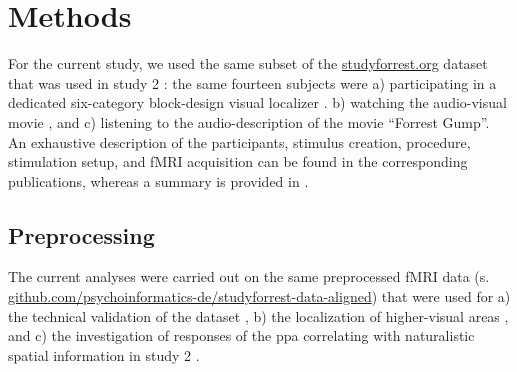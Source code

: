 \section{Methods}



For the current study, we used the same subset of the
\href{http://www.studyforrest.org}{studyforrest.org} dataset that was used in
study 2 \citep{haeusler2022processing}:
%
the same fourteen subjects were
a) participating in a dedicated six-category block-design visual localizer
\citep{sengupta2016extension}.
b) watching the audio-visual movie \citep{hanke2016simultaneous}, and
c) listening to the audio-description \citep{hanke2014audiomovie} of the movie
``Forrest Gump''.
An exhaustive description of the participants, stimulus creation, procedure,
stimulation setup, and fMRI acquisition can be found in the corresponding
publications, whereas a summary is provided in \citep{haeusler2022processing}.


\subsection{Preprocessing}

The current analyses were carried out on the same preprocessed fMRI data (s.
\href{https://github.com/psychoinformatics-de/studyforrest-data-aligned
}{\url{github.com/psychoinformatics-de/studyforrest-data-aligned}}) that were
used for
%
a) the technical validation of the dataset \citep{hanke2016simultaneous},
%
b) the localization of higher-visual areas \citep{sengupta2016extension}, and
%
c) the investigation of responses of the \ac{ppa} correlating with naturalistic
spatial information in study 2 \citep{haeusler2022processing}.

